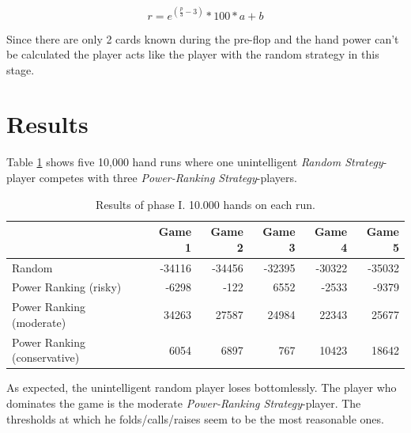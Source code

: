 \begin{equation}
	\label{equ:powerranking}
	r = e^{(\frac{p}{3} - 3)} * 100 * a + b
\end{equation}

Since there are only 2 cards known during the pre-flop and the hand power can't be calculated the player acts like the player with the random strategy in this stage.

\section{Results}
Table \ref{tbl:resultsPhase1} shows five 10,000 hand runs where one unintelligent \emph{Random Strategy}-player competes with three \emph{Power-Ranking Strategy}-players.
\begin{table}[h]
	\centering
	\begin{tabular}[h]{l|r|r|r|r|r}
		& \textbf{Game 1} & \textbf{Game 2} & \textbf{Game 3} & \textbf{Game 4} & \textbf{Game 5}\\
		\hline
		Random & -34116 & -34456 & -32395 & -30322 & -35032\\
		Power Ranking (risky) & -6298 & -122 & 6552 & -2533 & -9379\\
		Power Ranking (moderate) & 34263 & 27587 & 24984 & 22343 & 25677\\
		Power Ranking (conservative) & 6054 & 6897 & 767 & 10423 & 18642\\
	\end{tabular}
	\label{tbl:resultsPhase1}
	\caption{Results of phase I. 10.000 hands on each run.}
\end{table}

As expected, the unintelligent random player loses bottomlessly. The player who dominates the game is the moderate \emph{Power-Ranking Strategy}-player. The thresholds at which he folds/calls/raises seem to be the most reasonable ones.

